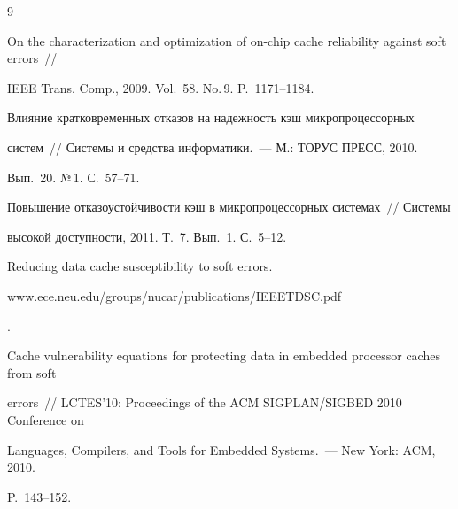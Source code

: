   {\small\frenchspacing

{%


\begin{thebibliography}{9}

    



On the characterization and optimization of on-chip cache reliability against soft errors~/\!\!/ 

IEEE Trans. Comp., 2009. Vol.~58. No.\,9. P.~1171--1184.





Влияние кратковременных отказов на надежность кэш микропроцессорных 

систем~/\!\!/ Системы и средства информатики.~--- М.: ТОРУС ПРЕСС, 2010. 

Вып.~20. №\,1. С.~57--71.





Повышение отказоустойчивости кэш в микропроцессорных системах~/\!\!/ Системы 

высокой доступности, 2011. Т.~7. Вып.~1. С.~5--12.





Reducing data cache susceptibility to soft errors. {\sf 

www.ece.neu.edu/groups/nucar/publications/IEEETDSC.pdf}. 







Cache vulnerability equations for protecting data in embedded processor caches from soft 

errors~/\!\!/ LCTES'10: Proceedings of the ACM SIGPLAN/SIGBED 2010 Conference on 

Languages, Compilers, and Tools for Embedded Systems.~--- New York: ACM, 2010. 

P.~143--152.




\end{thebibliography}}}
